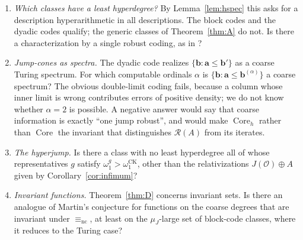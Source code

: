 \documentclass[11pt,letterpaper]{article}
\theoremstyle{definition}
\numberwithin{equation}{section}
\newcommand{\N}{\mathbb N}
\newcommand{\Cantor}{2^{\N}}
\newcommand{\eqT}{\equiv_{\mathrm T}}
\newcommand{\eqnc}{\equiv_{\mathrm{nc}}}
\newcommand{\DX}[1]{\mathcal D_{#1}}
\newcommand{\Core}{\operatorname{Core}}
\newcommand{\J}{J}
\newcommand{\Rc}{\mathcal R}
\newcommand{\sd}{\mathbin{\triangle}}
\newcommand{\Coreh}{\operatorname{Core}_h}
\newcommand{\omck}{\omega_1^{\mathrm{CK}}}
\newcommand{\KO}{\mathcal O}
\begin{document}
\begin{enumerate}[label=\textup{(Q\arabic*)},leftmargin=3em]
Fourth, the classical theorem does not transfer along the obvious parametrization. One would like to pull (\dag) back to Cantor space by a map $\Phi:\Cantor\to B(Z,r)\cap\DX X$, say $\Phi(Y)=Z\sd\{n_k:Y(k)=1\}$ for a sufficiently sparse computable $(n_k)$, which is a continuous injection with $\Phi(Y)\eqT Y\oplus Z$. But $\Phi$ has compact image, and $\DX X$ is a perfect Polish space that is nowhere locally compact, so the image is nowhere dense and the preimage of a comeager set may be empty. Any transfer must therefore use a parametrization by Baire space rather than Cantor space, and must respect hyperdegrees, which an abstract homeomorphism will not.

What remains is to run the $\Sigma^1_1$ category machinery of effective descriptive set theory directly in $\DX X$ with a presentation for which ``comeager'' is itself $\Sigma^1_1$-definable, as in Kechris's uniformity theorems. We have not attempted this.
\item \emph{Which classes have a least hyperdegree?} By Lemma~\ref{lem:hspec} this asks for a description hyperarithmetic in all descriptions. The block codes and the dyadic codes qualify; the generic classes of Theorem~\ref{thm:A} do not. Is there a characterization by a single robust coding, as in \cite[Theorem~3.6]{Synthesis}?
\item \emph{Jump-cones as spectra.} The dyadic code realizes $\{\mathbf b:\mathbf a\le\mathbf b'\}$ as a coarse Turing spectrum. For which computable ordinals $\alpha$ is $\{\mathbf b:\mathbf a\le\mathbf b^{(\alpha)}\}$ a coarse spectrum? The obvious double-limit coding fails, because a column whose inner limit is wrong contributes errors of positive density; we do not know whether $\alpha=2$ is possible. A negative answer would say that coarse information is exactly ``one jump robust'', and would make $\Coreh$ rather than $\Core$ the invariant that distinguishes $\Rc(A)$ from its iterates.
\item \emph{The hyperjump.} Is there a class with no least hyperdegree all of whose representatives $g$ satisfy $\omega_1^g>\omck$, other than the relativizations $\J(\KO)\oplus A$ given by Corollary~\ref{cor:infimum}?
\item \emph{Invariant functions.} Theorem~\ref{thm:D} concerns invariant sets. Is there an analogue of Martin's conjecture for functions on the coarse degrees that are invariant under $\eqnc$, at least on the $\mu_\J$-large set of block-code classes, where it reduces to the Turing case?
\end{enumerate}
\end{document}
